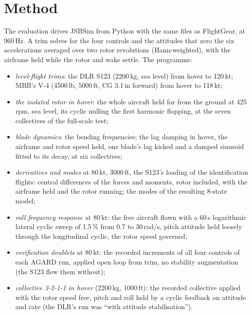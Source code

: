 \documentclass[10pt,a4paper,twocolumn]{article}
\newcommand{\Tab}[1]{}
\begin{document}
\begin{table}[t]
\centering\small
\caption{Principal data. Sources: TR~\cite{tr}, PT~\cite{pt}, AR~\cite{ar}, HF~\cite{hf}, EA~\cite{ea}, HG~\cite{hg}.}\label{tab:params}
\Tab{params}
\end{table}

\section{Method}\label{sec:method}
The evaluation drives JSBSim from Python with the same files as FlightGear, at 960\,Hz. A trim solves for the four controls and the attitudes that
zero the six accelerations averaged over two rotor revolutions (Hann-weighted), with the airframe held while the rotor and wake settle. The programme:
\begin{itemize}
\item \emph{level-flight trims}: the DLR S123 (2200\,kg, sea level) from hover to 120\,kt; MBB's V-4 (4500\,lb, 5000\,ft, CG 3.1\,in forward) from
hover to 118\,kt;
\item \emph{the isolated rotor in hover}: the whole aircraft held far from the ground at 425\,rpm, sea level, its cyclic nulling the first harmonic flapping,
at the seven collectives of the full-scale test;
\item \emph{blade dynamics}: the bending frequencies; the lag damping in hover, the airframe and rotor speed held, one blade's lag kicked and a damped
sinusoid fitted to its decay, at six collectives;
\item \emph{derivatives and modes} at 80\,kt, 3000\,ft, the S123's loading of the identification flights: central differences of the forces and
moments, rotor included, with the airframe held and the rotor running; the modes of the resulting 8-state model;
\item \emph{roll frequency response} at 80\,kt: the free aircraft flown with a 60\,s logarithmic lateral cyclic sweep of 1.5\,\% from 0.7 to
30\,rad/s, pitch attitude held loosely through the longitudinal cyclic, the rotor speed governed;
\item \emph{verification doublets} at 80\,kt: the recorded increments of all four controls of each AGARD run, applied open loop from trim, no
stability augmentation (the S123 flew them without);
\item \emph{collective 3-2-1-1 in hover} (2200\,kg, 1000\,ft): the recorded collective applied with the rotor speed free, pitch and roll held by a
cyclic feedback on attitude and rate (the DLR's run was ``with attitude stabilisation'').
\end{itemize}
\end{document}
